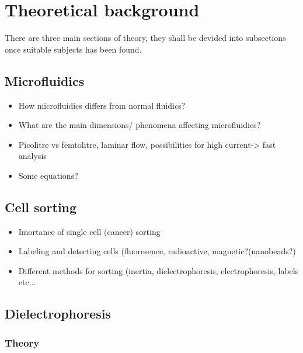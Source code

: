 \documentclass[final]{jyflluk}
\begin{document}
\section{Theoretical background}
\label{sec:theoretical_background}

There are three main sections of theory, they shall be devided into subsections once suitable subjects has been found.

\subsection{Microfluidics}
\label{sec:subsection1}
\begin{itemize}
    \item  How microfluidics differs from normal fluidics?
    \item  What are the main dimensions/ phenomena affecting microfluidics? 
    \item  Picolitre vs femtolitre, laminar flow, possibilities for high current-> fast analysis
    \item  Some equations? 
\end{itemize}




\subsection{Cell sorting}
\label{sec:x2}
 \begin{itemize}
     \item Imortance of single cell (cancer) sorting
     \item Labeling and detecting cells (fluoresence, radioactive, magnetic?(nanobeads?)
     \item Different methods for sorting (inertia, dielectrophoresis, electrophoresis, labels etc...
 \end{itemize}

\newpage
\subsection{Dielectrophoresis}
\label{sec:x3}
\subsubsection{Theory}
\label{sex:x3.1}
\end{document}
